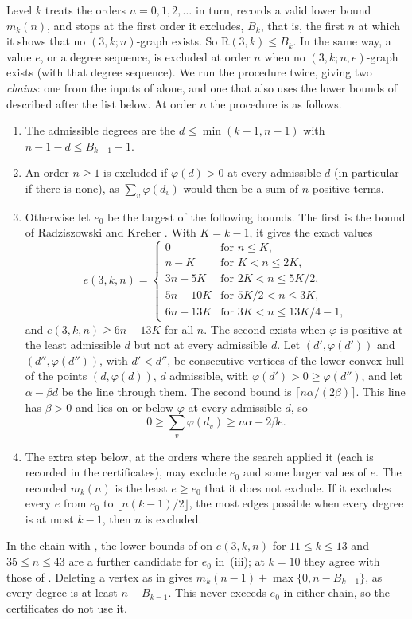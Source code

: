 \documentclass[11pt]{article}
\theoremstyle{spacedplain}
\theoremstyle{spaceddef}
\theoremstyle{spacedremark}
\newcommand{\R}{\mathrm{R}}
\begin{document}
Level $k$ treats the orders $n=0,1,2,\dots$ in turn, records a valid lower bound $m_k(n)$, and stops at the first order it excludes, $B_k$, that is, the first $n$ at which it shows that no $(3,k;n)$-graph exists.
So $\R(3,k)\le B_k$.
In the same way, a value $e$, or a degree sequence, is excluded at order $n$ when no $(3,k;n,e)$-graph exists (with that degree sequence).
We run the procedure twice, giving two \emph{chains}: one from the inputs of \cite{GR13} alone, and one that also uses the lower bounds of \cite{Back3} described after the list below.
At order $n$ the procedure is as follows.
\begin{enumerate}[label=(\roman*)]
\item The admissible degrees are the $d\le\min(k-1,n-1)$ with $n-1-d\le B_{k-1}-1$.
\item An order $n\ge 1$ is excluded if $\varphi(d)>0$ at every admissible $d$ (in particular if there is none), as $\sum_v\varphi(d_v)$ would then be a sum of $n$ positive terms.
\item Otherwise let $e_0$ be the largest of the following bounds.
The first is the bound of Radziszowski and Kreher \cite[Theorem~2]{GR13}.
With $K=k-1$, it gives the exact values
\[
e(3,k,n)=\begin{cases}
0 & \text{for } n\le K,\\
n-K & \text{for } K<n\le 2K,\\
3n-5K & \text{for } 2K<n\le 5K/2,\\
5n-10K & \text{for } 5K/2<n\le 3K,\\
6n-13K & \text{for } 3K<n\le 13K/4-1,
\end{cases}
\]
and $e(3,k,n)\ge 6n-13K$ for all $n$.
The second exists when $\varphi$ is positive at the least admissible $d$ but not at every admissible $d$.
Let $(d',\varphi(d'))$ and $(d'',\varphi(d''))$, with $d'<d''$, be consecutive vertices of the lower convex hull of the points $(d,\varphi(d))$, $d$ admissible, with $\varphi(d')>0\ge\varphi(d'')$, and let $\alpha-\beta d$ be the line through them.
The second bound is $\lceil n\alpha/(2\beta)\rceil$.
This line has $\beta>0$ and lies on or below $\varphi$ at every admissible $d$, so
\[
0\ge\sum_v\varphi(d_v)\ge n\alpha-2\beta e .
\]
\item The extra step below, at the orders where the search applied it (each is recorded in the certificates), may exclude $e_0$ and some larger values of $e$.
The recorded $m_k(n)$ is the least $e\ge e_0$ that it does not exclude.
If it excludes every $e$ from $e_0$ to $\lfloor n(k-1)/2\rfloor$, the most edges possible when every degree is at most $k-1$, then $n$ is excluded.
\end{enumerate}
In the chain with \cite{Back3}, the lower bounds of \cite{Back3} on $e(3,k,n)$ for $11\le k\le 13$ and $35\le n\le 43$ are a further candidate for $e_0$ in~(iii); at $k=10$ they agree with those of \cite{GR13}.
Deleting a vertex as in \cite[Lemma~3.5(a)]{DC26} gives $m_k(n-1)+\max\{0,n-B_{k-1}\}$, as every degree is at least $n-B_{k-1}$.
This never exceeds $e_0$ in either chain, so the certificates do not use it.
\end{document}

